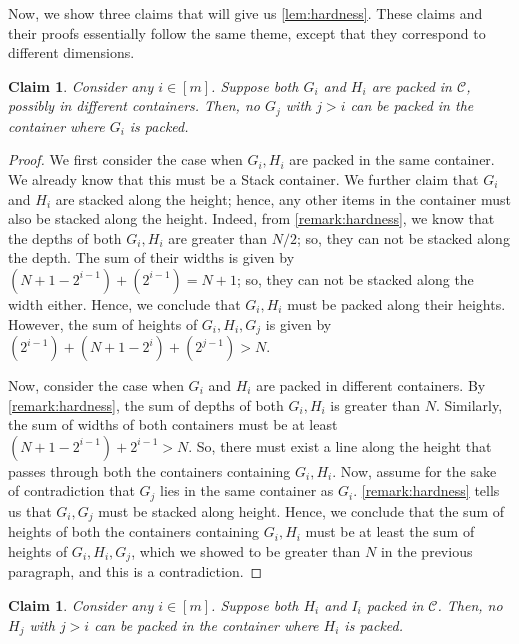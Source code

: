 \documentclass[10pt,a4paper]{amsart}
\newtheorem{claim}[theorem]{Claim}
\theoremstyle{definition}
\begin{document}
Now, we show three claims that will give us \cref{lem:hardness}. These claims and their proofs essentially follow the same theme, except that they correspond to different dimensions.
\begin{claim}
\label{lem:ghg}
    Consider any $i\in[m]$. Suppose both $G_i$ and $H_i$ are packed in $\mathcal C$, possibly in different containers. Then, no $G_j$ with $j>i$ can be packed in the container where $G_i$ is packed.
\end{claim}
\begin{proof}
    We first consider the case when $G_i,H_i$ are packed in the same container.
    We already know that this must be a Stack container. We further claim that $G_i$ and $H_i$ are stacked along the height; hence, any other items in the container must also be stacked along the height.
    Indeed, from \cref{remark:hardness}, we know that the depths of both $G_i,H_i$ are greater than $N/2$; so, they can not be stacked along the depth. The sum of their widths is given by $(N+1-2^{i-1})+(2^{i-1})=N+1$; so, they can not be stacked along the width either. Hence, we conclude that $G_i,H_i$ must be packed along their heights. However, the sum of heights of $G_i,H_i,G_j$ is given by $(2^{i-1})+(N+1-2^{i})+(2^{j-1})>N$.

    Now, consider the case when $G_i$ and $H_i$ are packed in different containers.
    By \cref{remark:hardness}, the sum of depths of both $G_i,H_i$ is greater than $N$. Similarly, the sum of widths of both containers must be at least $(N+1-2^{i-1})+2^{i-1}>N$.
    So, there must exist a line along the height that passes through both the containers containing $G_i,H_i$.
    Now, assume for the sake of contradiction that $G_j$ lies in the same container as $G_i$. \cref{remark:hardness} tells us that $G_i,G_j$ must be stacked along height.
    Hence, we conclude that the sum of heights of both the containers containing $G_i,H_i$ must be at least the sum of heights of $G_i,H_i,G_j$, which we showed to be greater than $N$ in the previous paragraph,
    and this is a contradiction.
\end{proof}
\begin{claim}
\label{lem:hih}
    Consider any $i\in[m]$. Suppose both $H_i$ and $I_i$ packed in $\mathcal C$. Then, no $H_j$ with $j>i$ can be packed in the container where $H_i$ is packed.
\end{claim}
\end{document}
